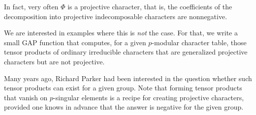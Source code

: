 \documentclass[a4paper,11pt]{report}
\begin{document}
{{{ In fact, very often $\Phi$ is a projective character, that is, the coefficients of the decomposition into
projective indecomposable characters are nonnegative. 

 We are interested in examples where this is \emph{not} the case. For that, we write a small \textsf{GAP} function that computes, for a given $p$-modular character table, those tensor products of ordinary irreducible
characters that are generalized projective characters but are not projective. 

 Many years ago, Richard Parker had been interested in the question whether
such tensor products can exist for a given group. Note that forming tensor
products that vanish on $p$-singular elements is a recipe for creating projective characters, provided
one knows in advance that the answer is negative for the given group. 

}}}
\end{document}

